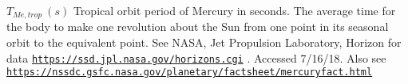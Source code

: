 $ T_{Me,trop} \ (s)$ Tropical orbit period of Mercury in seconds. The average time for the body to make one revolution about the Sun from one point in its seasonal orbit to the equivalent point. See N\+A\+SA, Jet Propulsion Laboratory, Horizon for data \href{https://ssd.jpl.nasa.gov/horizons.cgi}{\tt https\+://ssd.\+jpl.\+nasa.\+gov/horizons.\+cgi} . Accessed 7/16/18. Also see \href{https://nssdc.gsfc.nasa.gov/planetary/factsheet/mercuryfact.html}{\tt https\+://nssdc.\+gsfc.\+nasa.\+gov/planetary/factsheet/mercuryfact.\+html} 